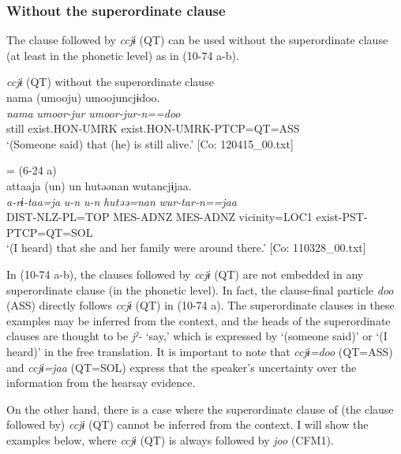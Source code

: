 \subsubsection{Without the superordinate clause}\label{sec:10.4.1.7}

The clause followed by \textit{ccjɨ} (QT) can be used without the superordinate clause (at least in the phonetic level) as in (10-74 a-b).

\ea\label{ex:10.74}   \textit{ccjɨ} (QT) without the superordinate clause\\
  \ea  %
      \glll    nama  (umooju)  umoojuncjɨdoo.\\
      \textit{nama}  \textit{umoor-jur}  \textit{umoor-jur-n==doo}\\
      still  exist.HON-UMRK  exist.HON-UMRK-PTCP=QT=ASS\\
      \glt       ‘(Someone said) that (he) is still alive.’ [Co: 120415\_00.txt]

  \ex{} = (6-24 a)\\
      \glll    attaaja  (un)  un  hutəənan   wutancjɨjaa.\\
      \textit{a-rɨ-taa=ja}  \textit{u-n}  \textit{u-n}  \textit{hutəə=nan} \textit{wur-tar-n==jaa}\\
      DIST-NLZ-PL=TOP  MES-ADNZ  MES-ADNZ  vicinity=LOC1 exist-PST-PTCP=QT=SOL\\
      \glt       ‘(I heard) that she and her family were around there.’ [Co: 110328\_00.txt]
    \z
\z

In (10-74 a-b), the clauses followed by \textit{ccjɨ} (QT) are not embedded in any superordinate clause (in the phonetic level). In fact, the clause-final particle \textit{doo} (ASS) directly follows \textit{ccjɨ} (QT) in (10-74 a). The superordinate clauses in these examples may be inferred from the context, and the heads of the superordinate clauses are thought to be \textit{jˀ-} ‘say,’ which is expressed by ‘(someone said)’ or ‘(I heard)’ in the free translation. It is important to note that \textit{ccjɨ=doo} (QT=ASS) and \textit{ccjɨ=jaa} (QT=SOL) express that the speaker’s uncertainty over the information from the hearsay evidence.

  On the other hand, there is a case where the superordinate clause of (the clause followed by) \textit{ccjɨ} (QT) cannot be inferred from the context. I will show the examples below, where \textit{ccjɨ} (QT) is always followed by \textit{joo} (CFM1).

